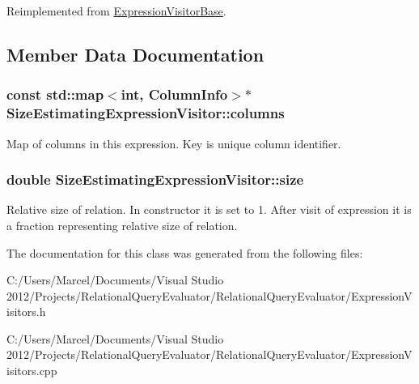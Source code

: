 Reimplemented from \hyperlink{class_expression_visitor_base_a9750397f5588263509a28ca9f17e8bc4}{Expression\+Visitor\+Base}.



\subsection{Member Data Documentation}
\hypertarget{class_size_estimating_expression_visitor_ac3830138167760ff403ad52bd606a560}{
\subsubsection[{columns}]{\setlength{\rightskip}{0pt plus 5cm}const std\+::map$<$int, {\bf Column\+Info}$>$$\ast$ Size\+Estimating\+Expression\+Visitor\+::columns}}\label{class_size_estimating_expression_visitor_ac3830138167760ff403ad52bd606a560}
Map of columns in this expression. Key is unique column identifier. \hypertarget{class_size_estimating_expression_visitor_a882681f529d9c9cb182ad76a1734921e}{
\subsubsection[{size}]{\setlength{\rightskip}{0pt plus 5cm}double Size\+Estimating\+Expression\+Visitor\+::size}}\label{class_size_estimating_expression_visitor_a882681f529d9c9cb182ad76a1734921e}
Relative size of relation. In constructor it is set to 1. After visit of expression it is a fraction representing relative size of relation. 

The documentation for this class was generated from the following files\+:\begin{DoxyCompactItemize}
\item 
C\+:/\+Users/\+Marcel/\+Documents/\+Visual Studio 2012/\+Projects/\+Relational\+Query\+Evaluator/\+Relational\+Query\+Evaluator/Expression\+Visitors.\+h\item 
C\+:/\+Users/\+Marcel/\+Documents/\+Visual Studio 2012/\+Projects/\+Relational\+Query\+Evaluator/\+Relational\+Query\+Evaluator/Expression\+Visitors.\+cpp\end{DoxyCompactItemize}
